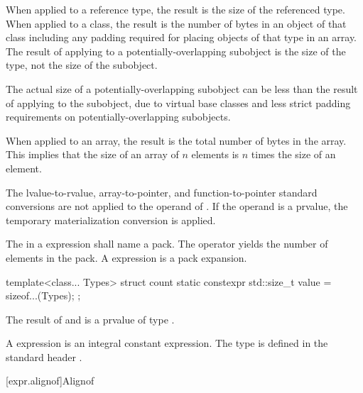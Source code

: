 \pnum
{}%
When applied to a reference type, the result is the size
of the referenced type.
%
When applied to a class, the result is the number of bytes in an object
of that class including any padding required for placing objects of that
type in an array.
The result of applying  to a
potentially-overlapping subobject is
the size of the type, not the size of the subobject.
\begin{footnote}
The actual size of a potentially-overlapping subobject
can be less than the result of
applying  to the subobject, due to virtual base classes
and less strict padding requirements on potentially-overlapping subobjects.
\end{footnote}
%
When applied to an array, the result is the total number of bytes in the
array. This implies that the size of an array of $n$ elements is
$n$ times the size of an element.

\pnum
The lvalue-to-rvalue,
array-to-pointer, and
function-to-pointer standard conversions are not
applied to the operand of .
If the operand is a prvalue,
the temporary materialization conversion
is applied.

\pnum
The  in a  expression shall name a
pack. The  operator yields the number of elements
in the pack.
A  expression is a pack expansion.
\begin{example}
\begin{codeblock}
template<class... Types>
struct count {
  static constexpr std::size_t value = sizeof...(Types);
};
\end{codeblock}
\end{example}

\pnum
{}%
%
The result of  and  is a prvalue of type
.
\begin{note}
A  expression
is an integral constant expression.
The type  is defined in the standard header
.
\end{note}

[expr.alignof]{Alignof}

